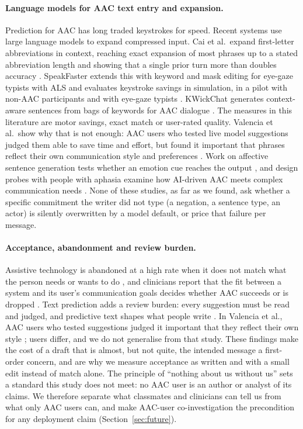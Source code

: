 \paragraph{Language models for AAC text entry and expansion.}
Prediction for AAC has long traded keystrokes for speed. Recent systems use large language models to expand compressed input. Cai et al.\ expand first-letter abbreviations in context, reaching exact expansion of most phrases up to a stated abbreviation length and showing that a single prior turn more than doubles accuracy \cite{cai2022abbrev}. SpeakFaster extends this with keyword and mask editing for eye-gaze typists with ALS and evaluates keystroke savings in simulation, in a pilot with non-AAC participants and with eye-gaze typists \cite{cai2024speakfaster}. KWickChat generates context-aware sentences from bags of keywords for AAC dialogue \cite{shen2022kwickchat}. The measures in this literature are motor savings, exact match or user-rated quality. Valencia et al.\ show why that is not enough: AAC users who tested live model suggestions judged them able to save time and effort, but found it important that phrases reflect their own communication style and preferences \cite{valencia2023less}. Work on affective sentence generation tests whether an emotion cue reaches the output \cite{choudhury2025alignment}, and design probes with people with aphasia examine how AI-driven AAC meets complex communication needs \cite{mao2025designprobes}. None of these studies, as far as we found, ask whether a specific commitment the writer did not type (a negation, a sentence type, an actor) is silently overwritten by a model default, or price that failure per message.

\paragraph{Acceptance, abandonment and review burden.}
Assistive technology is abandoned at a high rate when it does not match what the person needs or wants to do \cite{phillips1993abandonment}, and clinicians report that the fit between a system and its user's communication goals decides whether AAC succeeds or is dropped \cite{johnson2006abandonment}. Text prediction adds a review burden: every suggestion must be read and judged, and predictive text shapes what people write \cite{arnold2020predictable}. In Valencia et al., AAC users who tested suggestions judged it important that they reflect their own style \cite{valencia2023less}; users differ, and we do not generalise from that study. These findings make the cost of a draft that is almost, but not quite, the intended message a first-order concern, and are why we measure acceptance as written and with a small edit instead of match alone. The principle of ``nothing about us without us'' \cite{charlton1998nothing} sets a standard this study does not meet: no AAC user is an author or analyst of its claims. We therefore separate what classmates and clinicians can tell us from what only AAC users can, and make AAC-user co-investigation the precondition for any deployment claim (Section~\ref{sec:future}).

